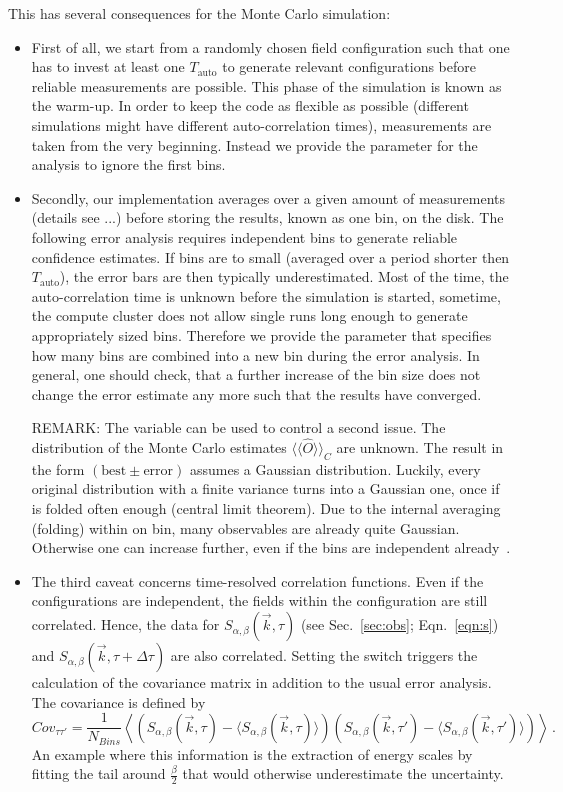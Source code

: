 This has several consequences for the Monte Carlo simulation:
\begin{itemize}
	\item First of all, we start from a randomly chosen field configuration such that one has to invest at least one $T_\mathrm{auto}$ to generate relevant configurations before reliable measurements are possible. This phase of the simulation is known as the warm-up. In order to keep the code as flexible as possible (different simulations might have different auto-correlation times), measurements are taken from the very beginning. Instead we provide the parameter  for the analysis to ignore the first  bins.
	\item Secondly, our implementation averages over a given amount of measurements (details see ...) before storing the results, known as one bin, on the disk. The following error analysis requires independent bins to generate reliable confidence estimates. If bins are to small (averaged over a period shorter then $T_\mathrm{auto}$), the error bars are then typically underestimated. Most of the time, the auto-correlation time is unknown before the simulation is started, sometime, the compute cluster does not allow single runs long enough to generate appropriately sized bins. Therefore we provide the  parameter that specifies how many bins are combined into a new bin during the error analysis. In general, one should check, that a further increase of the bin size does not change the error estimate any more such that the results have converged.
	
	REMARK: The  variable can be used to control a second issue. The distribution of the Monte Carlo estimates $\langle\langle\hat{O}\rangle\rangle_C$ are unknown. The result in the form $(\mathrm{best}\pm \mathrm{error})$ assumes a Gaussian distribution. Luckily, every original distribution with a finite variance turns into a Gaussian one, once if is folded often enough (central limit theorem). Due to the internal averaging (folding) within on bin, many observables are already quite Gaussian. Otherwise one can increase  further, even if the bins are independent already~\cite{Bercx17}.
	\item The third caveat concerns time-resolved correlation functions. Even if the configurations are independent, the fields within the configuration are still correlated. Hence, the data for $S_{\alpha,\beta}(\vec{k},\tau)$ (see Sec.~\ref{sec:obs}; Eqn.~\ref{eqn:s}) and $S_{\alpha,\beta}(\vec{k},\tau+\Delta\tau)$ are also correlated. Setting the switch  triggers the calculation of the covariance matrix in addition to the usual error analysis. The covariance is defined by
	\begin{equation}
		Cov_{\tau \tau'}=\frac{1}{N_{Bins}}\left\langle\left(S_{\alpha,\beta}(\vec{k},\tau)-\langle S_{\alpha,\beta}(\vec{k},\tau)\rangle\right)\left(S_{\alpha,\beta}(\vec{k},\tau')-\langle S_{\alpha,\beta}(\vec{k},\tau')\rangle\right)\right\rangle\,.
	\end{equation}
	An example where this information is the extraction of energy scales by fitting the tail around $\frac{\beta}{2}$ that would otherwise underestimate the uncertainty.
\end{itemize}
